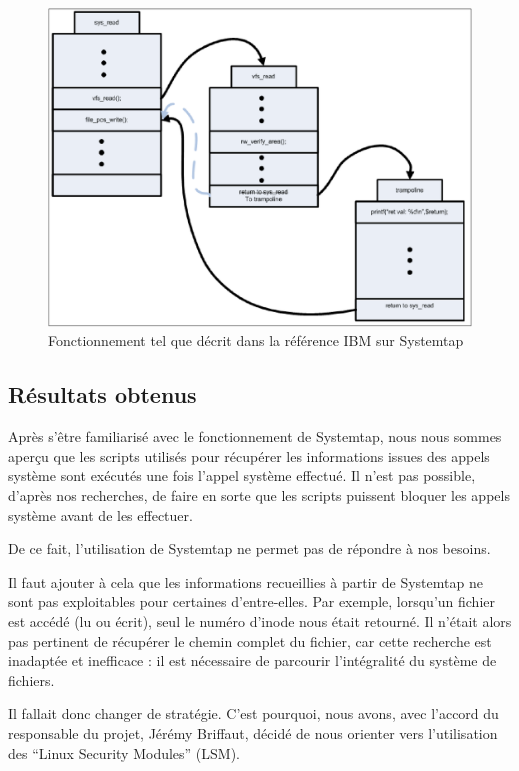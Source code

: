 \documentclass[pdftex,a4paper,titlepage,11pt,openright]{article}
\begin{document}
\begin{figure}[hb]
	\centering
	\includegraphics[scale=0.4]{kretprob.png}
	\caption{Fonctionnement tel que décrit dans la référence IBM sur Systemtap \cite{IBMRBST}}
\end{figure}

\newpage

\subsection{Résultats obtenus}

Après s'être familiarisé avec le fonctionnement de Systemtap, nous nous sommes aperçu que les scripts utilisés pour récupérer les informations issues des appels système sont exécutés une fois l'appel système effectué. Il n'est pas possible, d'après nos recherches, de faire en sorte que les scripts puissent bloquer les appels système avant de les effectuer.

De ce fait, l'utilisation de Systemtap ne permet pas de répondre à nos besoins.

Il faut ajouter à cela que les informations recueillies à partir de Systemtap ne sont pas exploitables pour certaines d'entre-elles. Par exemple, lorsqu'un fichier est accédé (lu ou écrit), seul le numéro d'inode nous était retourné. Il n'était alors pas pertinent de récupérer le chemin complet du fichier, car cette recherche est inadaptée et inefficace : il est nécessaire de parcourir l'intégralité du système de fichiers.

Il fallait donc changer de stratégie. C'est pourquoi, nous avons, avec l'accord du responsable du projet, Jérémy Briffaut, décidé de nous orienter vers l'utilisation des ``Linux Security Modules'' (LSM).
\end{document}
